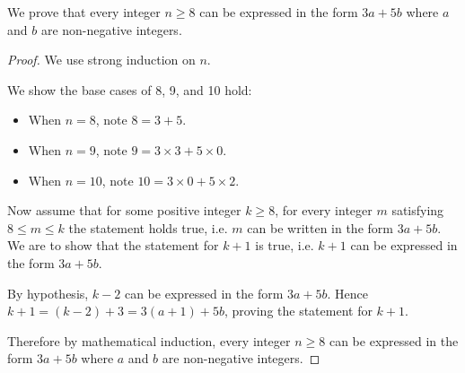 \begin{example}
    We prove that every integer $n \geq 8$ can be expressed in the form $3a + 5b$ where $a$ and $b$ are non-negative integers.
    \begin{proof}
        We use strong induction on $n$.
        
        We show the base cases of 8, 9, and 10 hold:
        \begin{itemize}
            \item When $n = 8$, note $8 = 3 + 5$.
            \item When $n = 9$, note $9 = 3 \times 3 + 5 \times 0$.
            \item When $n = 10$, note $10 = 3 \times 0 + 5 \times 2$.
        \end{itemize}
        
        Now assume that for some positive integer $k \geq 8$, for every integer $m$ satisfying $8 \leq m \leq k$ the statement holds true, i.e. $m$ can be written in the form $3a + 5b$. We are to show that the statement for $k+1$ is true, i.e. $k+1$ can be expressed in the form $3a + 5b$.
        
        By hypothesis, $k - 2$ can be expressed in the form $3a+5b$. Hence $k+1 = (k-2) + 3 = 3(a+1) + 5b$, proving the statement for $k+1$.
        
        Therefore by mathematical induction, every integer $n \geq 8$ can be expressed in the form $3a + 5b$ where $a$ and $b$ are non-negative integers.
    \end{proof}
\end{example}

